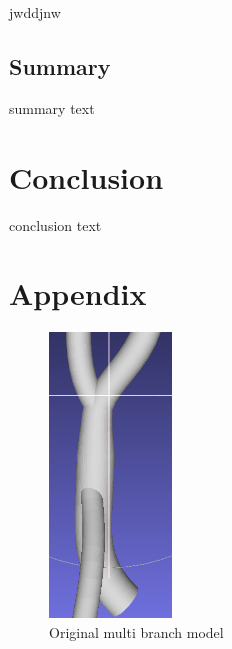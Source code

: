 \documentclass[11p, titlepage]{article}
\begin{document}
jwddjnw

\subsection{Summary}

summary text

\section{Conclusion}

conclusion text

\pagebreak



\section{Appendix}

\begin{figure}[h]
\centering
\includegraphics[width=0.29\textwidth]{mb}
\caption{Original multi branch model\label{fig:model}}
\end{figure}
\end{document}
